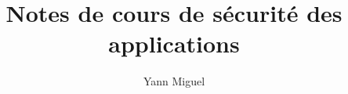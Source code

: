 \documentclass[a4paper, 12pt]{article}
\title{Notes de cours de sécurité des applications}
\author{Yann Miguel}
\begin{document}
\ttfamily
\maketitle
\tableofcontents
\newpage





\end{document}
